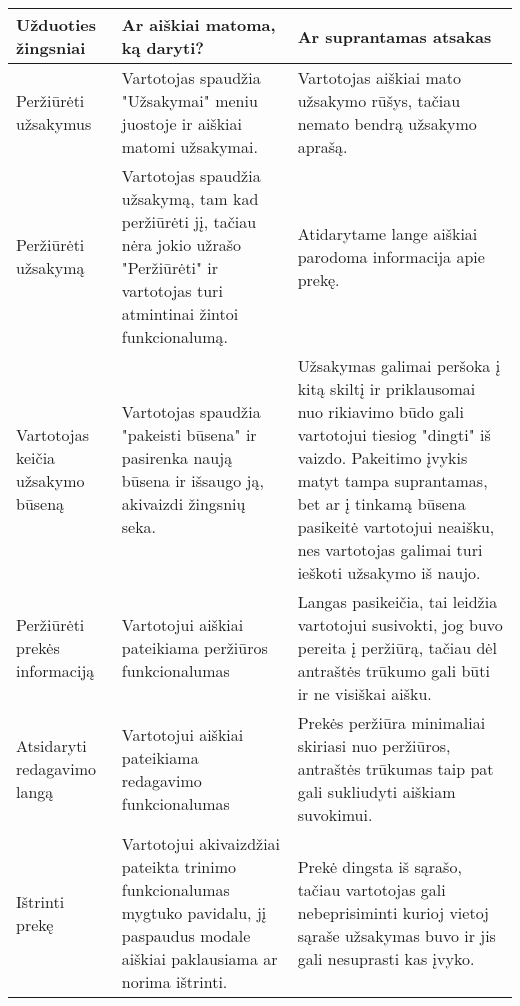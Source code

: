 \documentclass[oneside]{VUMIFPSkursinis}
\begin{document}
\begin{center}
	\begin{tabular}{ |p{3cm}| p{6cm} | p{8cm} | }
		\hline
		Užduoties žingsniai & Ar aiškiai matoma, ką daryti? & Ar suprantamas atsakas \\ \hline

		Peržiūrėti užsakymus &
		Vartotojas spaudžia "Užsakymai" meniu juostoje ir aiškiai matomi užsakymai. &
		Vartotojas aiškiai mato užsakymo rūšys, tačiau nemato bendrą užsakymo aprašą.
		\\ \hline

		Peržiūrėti užsakymą &
		Vartotojas spaudžia užsakymą, tam kad peržiūrėti jį, tačiau nėra jokio užrašo "Peržiūrėti" ir vartotojas turi atmintinai žintoi funkcionalumą. &
		Atidarytame lange aiškiai parodoma informacija apie prekę.
		\\ \hline

		Vartotojas keičia užsakymo būseną &
		Vartotojas spaudžia "pakeisti būsena" ir pasirenka naują būsena ir išsaugo ją, akivaizdi žingsnių seka. &
		Užsakymas galimai peršoka į kitą skiltį ir priklausomai nuo rikiavimo būdo gali vartotojui tiesiog "dingti" iš vaizdo.
		Pakeitimo įvykis matyt tampa suprantamas, bet ar į tinkamą būsena pasikeitė vartotojui neaišku, nes vartotojas galimai turi ieškoti užsakymo iš naujo.
		\\ \hline

		Peržiūrėti prekės informaciją &
		Vartotojui aiškiai pateikiama peržiūros funkcionalumas &
		Langas pasikeičia, tai leidžia vartotojui susivokti, jog buvo pereita į peržiūrą, tačiau dėl antraštės trūkumo gali būti ir ne visiškai aišku.
		\\ \hline

		Atsidaryti redagavimo langą &
		Vartotojui aiškiai pateikiama redagavimo funkcionalumas &
		Prekės peržiūra minimaliai skiriasi nuo peržiūros, antraštės trūkumas taip pat gali sukliudyti aiškiam suvokimui.
		\\ \hline

		Ištrinti prekę &
		Vartotojui akivaizdžiai pateikta trinimo funkcionalumas mygtuko pavidalu, jį paspaudus modale aiškiai paklausiama ar norima ištrinti. &
		Prekė dingsta iš sąrašo, tačiau vartotojas gali nebeprisiminti kurioj vietoj sąraše užsakymas buvo ir jis gali nesuprasti kas įvyko.
		\\ \hline
	\end{tabular}
\end{center}


\pagebreak
\end{document}
